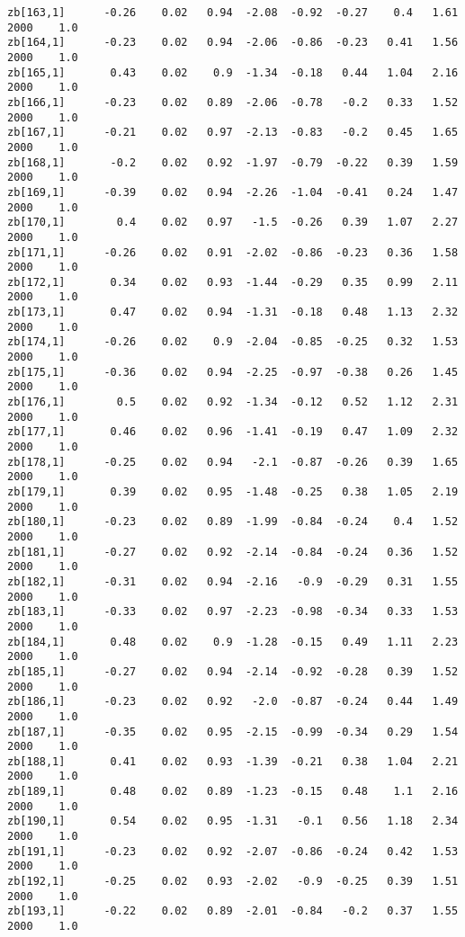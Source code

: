 \documentclass[11pt]{article}
\begin{document}
\begin{Verbatim}[commandchars=\\\{\}]
zb[163,1]      -0.26    0.02   0.94  -2.08  -0.92  -0.27    0.4   1.61   2000    1.0
zb[164,1]      -0.23    0.02   0.94  -2.06  -0.86  -0.23   0.41   1.56   2000    1.0
zb[165,1]       0.43    0.02    0.9  -1.34  -0.18   0.44   1.04   2.16   2000    1.0
zb[166,1]      -0.23    0.02   0.89  -2.06  -0.78   -0.2   0.33   1.52   2000    1.0
zb[167,1]      -0.21    0.02   0.97  -2.13  -0.83   -0.2   0.45   1.65   2000    1.0
zb[168,1]       -0.2    0.02   0.92  -1.97  -0.79  -0.22   0.39   1.59   2000    1.0
zb[169,1]      -0.39    0.02   0.94  -2.26  -1.04  -0.41   0.24   1.47   2000    1.0
zb[170,1]        0.4    0.02   0.97   -1.5  -0.26   0.39   1.07   2.27   2000    1.0
zb[171,1]      -0.26    0.02   0.91  -2.02  -0.86  -0.23   0.36   1.58   2000    1.0
zb[172,1]       0.34    0.02   0.93  -1.44  -0.29   0.35   0.99   2.11   2000    1.0
zb[173,1]       0.47    0.02   0.94  -1.31  -0.18   0.48   1.13   2.32   2000    1.0
zb[174,1]      -0.26    0.02    0.9  -2.04  -0.85  -0.25   0.32   1.53   2000    1.0
zb[175,1]      -0.36    0.02   0.94  -2.25  -0.97  -0.38   0.26   1.45   2000    1.0
zb[176,1]        0.5    0.02   0.92  -1.34  -0.12   0.52   1.12   2.31   2000    1.0
zb[177,1]       0.46    0.02   0.96  -1.41  -0.19   0.47   1.09   2.32   2000    1.0
zb[178,1]      -0.25    0.02   0.94   -2.1  -0.87  -0.26   0.39   1.65   2000    1.0
zb[179,1]       0.39    0.02   0.95  -1.48  -0.25   0.38   1.05   2.19   2000    1.0
zb[180,1]      -0.23    0.02   0.89  -1.99  -0.84  -0.24    0.4   1.52   2000    1.0
zb[181,1]      -0.27    0.02   0.92  -2.14  -0.84  -0.24   0.36   1.52   2000    1.0
zb[182,1]      -0.31    0.02   0.94  -2.16   -0.9  -0.29   0.31   1.55   2000    1.0
zb[183,1]      -0.33    0.02   0.97  -2.23  -0.98  -0.34   0.33   1.53   2000    1.0
zb[184,1]       0.48    0.02    0.9  -1.28  -0.15   0.49   1.11   2.23   2000    1.0
zb[185,1]      -0.27    0.02   0.94  -2.14  -0.92  -0.28   0.39   1.52   2000    1.0
zb[186,1]      -0.23    0.02   0.92   -2.0  -0.87  -0.24   0.44   1.49   2000    1.0
zb[187,1]      -0.35    0.02   0.95  -2.15  -0.99  -0.34   0.29   1.54   2000    1.0
zb[188,1]       0.41    0.02   0.93  -1.39  -0.21   0.38   1.04   2.21   2000    1.0
zb[189,1]       0.48    0.02   0.89  -1.23  -0.15   0.48    1.1   2.16   2000    1.0
zb[190,1]       0.54    0.02   0.95  -1.31   -0.1   0.56   1.18   2.34   2000    1.0
zb[191,1]      -0.23    0.02   0.92  -2.07  -0.86  -0.24   0.42   1.53   2000    1.0
zb[192,1]      -0.25    0.02   0.93  -2.02   -0.9  -0.25   0.39   1.51   2000    1.0
zb[193,1]      -0.22    0.02   0.89  -2.01  -0.84   -0.2   0.37   1.55   2000    1.0

\end{Verbatim}
\end{document}
